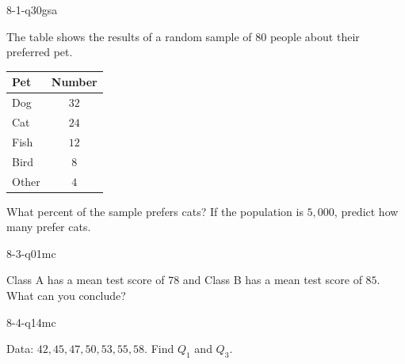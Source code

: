\begin{practiceQuestion}{8-1-q30}{gsa}
\begin{questionText}
The table shows the results of a random sample of $80$ people about their preferred pet.

\begin{center}
\begin{tabular}{|l|c|}
\hline
\textbf{Pet} & \textbf{Number} \\
\hline
Dog & $32$ \\
\hline
Cat & $24$ \\
\hline
Fish & $12$ \\
\hline
Bird & $8$ \\
\hline
Other & $4$ \\
\hline
\end{tabular}
\end{center}

What percent of the sample prefers cats? If the population is $5{,}000$, predict how many prefer cats.
\end{questionText}
\end{practiceQuestion}

\begin{practiceQuestion}{8-3-q01}{mc}
\begin{questionText}
Class A has a mean test score of $78$ and Class B has a mean test score of $85$. What can you conclude?
\end{questionText}
\end{practiceQuestion}

\begin{practiceQuestion}{8-4-q14}{mc}
\begin{questionText}
Data: $42, 45, 47, 50, 53, 55, 58$. Find $Q_1$ and $Q_3$.
\end{questionText}
\end{practiceQuestion}

